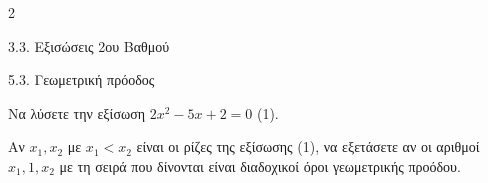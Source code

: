 \begin{ylh}{2}
    \item 3.3. Εξισώσεις 2ου Βαθμού
    \item 5.3. Γεωμετρική πρόοδος
\end{ylh}

\begin{alist}
\item Να λύσετε την εξίσωση $2x^2 - 5x + 2 = 0$ (1).
\item Αν $x_1, x_2$ με $x_1 < x_2$ είναι οι ρίζες της εξίσωσης (1), να εξετάσετε αν οι αριθμοί $x_1, 1, x_2$ με τη σειρά που δίνονται είναι διαδοχικοί όροι γεωμετρικής προόδου.
\end{alist}

